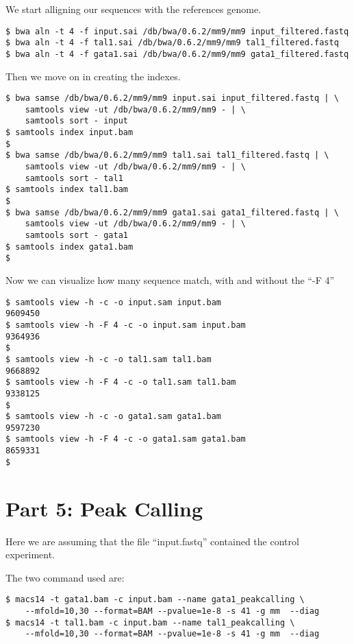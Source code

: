 \documentclass[11pt]{article} %
\begin{document}
We start alligning our sequences with the references genome.

\begin{lstlisting}
$ bwa aln -t 4 -f input.sai /db/bwa/0.6.2/mm9/mm9 input_filtered.fastq
$ bwa aln -t 4 -f tal1.sai /db/bwa/0.6.2/mm9/mm9 tal1_filtered.fastq
$ bwa aln -t 4 -f gata1.sai /db/bwa/0.6.2/mm9/mm9 gata1_filtered.fastq
\end{lstlisting}

Then we move on in creating the indexes.

\begin{lstlisting}
$ bwa samse /db/bwa/0.6.2/mm9/mm9 input.sai input_filtered.fastq | \
    samtools view -ut /db/bwa/0.6.2/mm9/mm9 - | \
    samtools sort - input
$ samtools index input.bam
$
$ bwa samse /db/bwa/0.6.2/mm9/mm9 tal1.sai tal1_filtered.fastq | \
    samtools view -ut /db/bwa/0.6.2/mm9/mm9 - | \
    samtools sort - tal1
$ samtools index tal1.bam
$
$ bwa samse /db/bwa/0.6.2/mm9/mm9 gata1.sai gata1_filtered.fastq | \
    samtools view -ut /db/bwa/0.6.2/mm9/mm9 - | \
    samtools sort - gata1
$ samtools index gata1.bam
$
\end{lstlisting}

Now we can visualize how many sequence match, with and without the ``-F 4''

\begin{lstlisting}
$ samtools view -h -c -o input.sam input.bam
9609450
$ samtools view -h -F 4 -c -o input.sam input.bam
9364936
$
$ samtools view -h -c -o tal1.sam tal1.bam
9668892
$ samtools view -h -F 4 -c -o tal1.sam tal1.bam
9338125
$
$ samtools view -h -c -o gata1.sam gata1.bam
9597230
$ samtools view -h -F 4 -c -o gata1.sam gata1.bam
8659331
$
\end{lstlisting}

\section{Part 5: Peak Calling}

Here we are assuming that the file ``input.fastq'' contained the control experiment.

The two command used are:

\begin{lstlisting}
$ macs14 -t gata1.bam -c input.bam --name gata1_peakcalling \
    --mfold=10,30 --format=BAM --pvalue=1e-8 -s 41 -g mm  --diag
$ macs14 -t tal1.bam -c input.bam --name tal1_peakcalling \
    --mfold=10,30 --format=BAM --pvalue=1e-8 -s 41 -g mm  --diag
\end{lstlisting}
\end{document}
